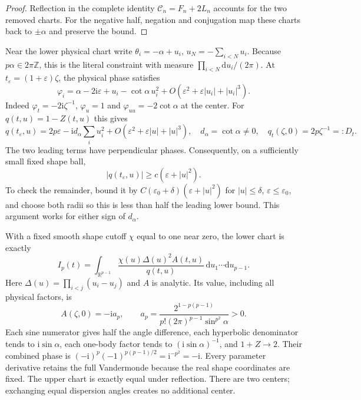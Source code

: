 \documentclass[11pt]{article}
\numberwithin{equation}{section}
\theoremstyle{remark}\newtheorem{remark}[theorem]{Remark}
\newcommand{\ii}{\mathrm i}
\newcommand{\dd}{\mathrm d}
\begin{document}
\begin{proof}
Reflection in the complete identity $\mathcal C_n=F_n+2L_n$
accounts for the two removed charts. For the negative half, negation and conjugation map
these charts back to $\pm\alpha$ and preserve the bound.
\end{proof}

Near the lower physical chart write
$\theta_i=-\alpha+u_i$, $u_N=-\sum_{i<N}u_i$.
Because $p\alpha\in2\pi\mathbb Z$, this is the literal
constraint with measure $\prod_{i<N}\dd u_i/(2\pi)$.
At $t_\varepsilon=(1+\varepsilon)\zeta$, the physical phase satisfies
\[
 \varphi_i=\alpha-2\ii\varepsilon+u_i-\cot\alpha\,u_i^2
      +O(\varepsilon^2+\varepsilon|u_i|+|u_i|^3).
\]
Indeed $\varphi_t=-2\ii\zeta^{-1}$,
$\varphi_u=1$ and $\varphi_{uu}=-2\cot\alpha$ at the center.
For $q(t,u)=1-Z(t,u)$ this gives
\begin{equation}\label{eq:single-q}
 q(t_\varepsilon,u)=2p\varepsilon-\ii d_\alpha\sum_i u_i^2
       +O(\varepsilon^2+\varepsilon|u|+|u|^3),\quad
 d_\alpha=\cot\alpha\ne0,\quad
 q_t(\zeta,0)=2p\zeta^{-1}=:D_t.
\end{equation}
The two leading terms have perpendicular phases. Consequently,
on a sufficiently small fixed shape ball,
\begin{equation}\label{eq:single-q-bound}
 |q(t_\varepsilon,u)|\ge c(\varepsilon+|u|^2).
\end{equation}
To check the remainder, bound it by
$C(\varepsilon_0+\delta)(\varepsilon+|u|^2)$ for
$|u|\le\delta$, $\varepsilon\le\varepsilon_0$, and choose
both radii so this is less than half the leading lower bound.
This argument works for either sign of $d_\alpha$.

With a fixed smooth shape cutoff $\chi$ equal to one near zero,
the lower chart is exactly
\begin{equation}\label{eq:angular-local-integral}
 I_p(t)=\int_{\mathbb R^{p-1}}
       \frac{\chi(u)\Delta(u)^2 A(t,u)}{q(t,u)}
                         \,\dd u_1\cdots\dd u_{p-1}.
\end{equation}
Here $\Delta(u)=\prod_{i<j}(u_i-u_j)$ and $A$ is analytic.
Its value, including all physical factors, is
\begin{equation}\label{eq:angular-local-prefactor}
 A(\zeta,0)=-\ii a_p,\qquad
 a_p=\frac{2^{1-p(p-1)}}{p!(2\pi)^{p-1}\sin^{p^2}\alpha}>0.
\end{equation}
Each sine numerator gives half the angle difference,
each hyperbolic denominator tends to $\ii\sin\alpha$,
each one-body factor tends to $(\ii\sin\alpha)^{-1}$,
and $1+Z\to2$. Their combined phase is
$(-\ii)^p(-1)^{p(p-1)/2}=\ii^{-p^2}=-\ii$.
Every parameter derivative retains the full Vandermonde
because the real shape coordinates are fixed.
The upper chart is exactly equal under reflection.
There are two centers; exchanging equal dispersion angles creates
no additional center.
\end{document}
